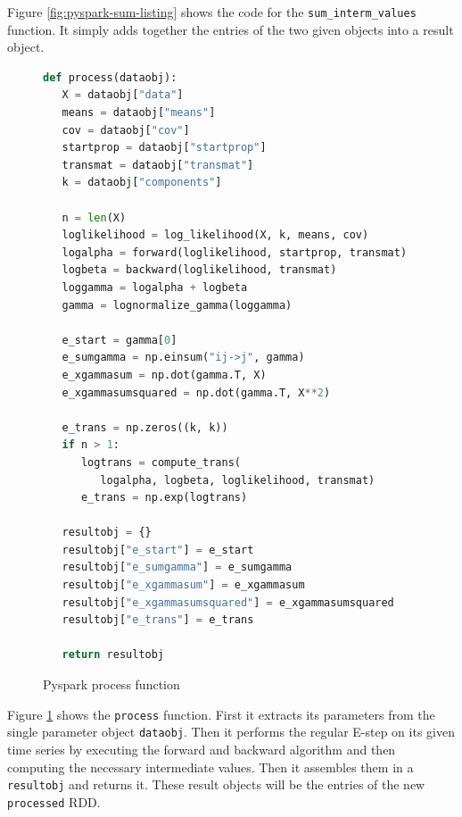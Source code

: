 Figure \ref{fig:pyspark-sum-listing} shows the code for the \texttt{sum\_interm\_values} function. It simply adds together the entries of the two given objects into a result object. 

\begin{figure}
\begin{singlespace}
\begin{lstlisting}[language=Python]
def process(dataobj):
   X = dataobj["data"]
   means = dataobj["means"]
   cov = dataobj["cov"]
   startprop = dataobj["startprop"]
   transmat = dataobj["transmat"]
   k = dataobj["components"]

   n = len(X)
   loglikelihood = log_likelihood(X, k, means, cov)
   logalpha = forward(loglikelihood, startprop, transmat)
   logbeta = backward(loglikelihood, transmat)
   loggamma = logalpha + logbeta
   gamma = lognormalize_gamma(loggamma)

   e_start = gamma[0]
   e_sumgamma = np.einsum("ij->j", gamma)
   e_xgammasum = np.dot(gamma.T, X)
   e_xgammasumsquared = np.dot(gamma.T, X**2)

   e_trans = np.zeros((k, k))
   if n > 1:
      logtrans = compute_trans(
         logalpha, logbeta, loglikelihood, transmat)
      e_trans = np.exp(logtrans)

   resultobj = {}
   resultobj["e_start"] = e_start
   resultobj["e_sumgamma"] = e_sumgamma
   resultobj["e_xgammasum"] = e_xgammasum
   resultobj["e_xgammasumsquared"] = e_xgammasumsquared
   resultobj["e_trans"] = e_trans

   return resultobj
\end{lstlisting}
\end{singlespace}
\caption{Pyspark process function}    
\label{fig:pyspark-process-listing}
\end{figure}

Figure \ref{fig:pyspark-process-listing} shows the \texttt{process} function. First it extracts its parameters from the single parameter object \texttt{dataobj}. Then it performs the regular E-step on its given time series by executing the forward and backward algorithm and then computing the necessary intermediate values. Then it assembles them in a \texttt{resultobj} and returns it. These result objects will be the entries of the new \texttt{processed} RDD.